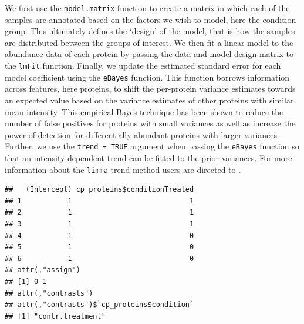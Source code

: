 \documentclass[9pt,a4paper,]{extarticle}
\newenvironment{Shaded}{\begin{snugshade}}{\end{snugshade}}
\newcommand{\DocumentationTok}[1]{\textcolor[rgb]{0.56,0.35,0.01}{\textbf{\textit{#1}}}}
\newcommand{\FunctionTok}[1]{\textcolor[rgb]{0.00,0.00,0.00}{#1}}
\newcommand{\NormalTok}[1]{#1}
\newcommand{\OtherTok}[1]{\textcolor[rgb]{0.56,0.35,0.01}{#1}}
\newcommand{\SpecialCharTok}[1]{\textcolor[rgb]{0.00,0.00,0.00}{#1}}
\begin{document}
We first use the \texttt{model.matrix} function to create a matrix in which each of the
samples are annotated based on the factors we wish to model, here the condition
group. This ultimately defines the `design' of the model, that is how the
samples are distributed between the groups of interest. We then fit a linear
model to the abundance data of each protein by passing the data and model design
matrix to the \texttt{lmFit} function. Finally, we update the estimated standard error
for each model coefficient using the \texttt{eBayes} function. This function borrows
information across features, here proteins, to shift the per-protein variance
estimates towards an expected value based on the variance estimates of other
proteins with similar mean intensity. This empirical Bayes technique has been
shown to reduce the number of false positives for proteins with small variances
as well as increase the power of detection for differentially abundant proteins
with larger variances \citep{Phipson2016}. Further, we use the \texttt{trend\ =\ TRUE} argument
when passing the \texttt{eBayes} function so that an intensity-dependent trend can be
fitted to the prior variances. For more information about the \texttt{limma} trend
method users are directed to \citep{Law2014}.

\begin{Shaded}
\end{Shaded}

\begin{verbatim}
##   (Intercept) cp_proteins$conditionTreated
## 1           1                            1
## 2           1                            1
## 3           1                            1
## 4           1                            0
## 5           1                            0
## 6           1                            0
## attr(,"assign")
## [1] 0 1
## attr(,"contrasts")
## attr(,"contrasts")$`cp_proteins$condition`
## [1] "contr.treatment"
\end{verbatim}
\end{document}
